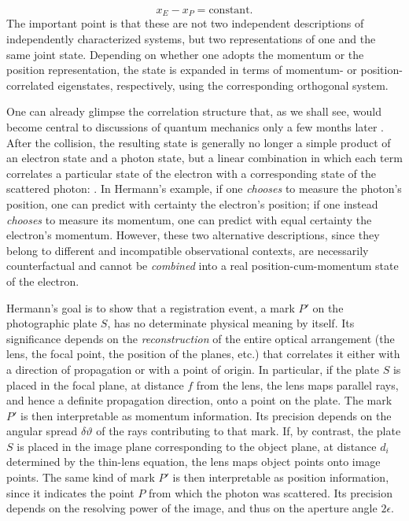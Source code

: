 \documentclass[pdflatex]{sn-jnl}
\newcommand{\NGQ}[2]{\citep[#1/#2]{Hermann1935}}
\begin{document}
\begin{equation*}
x_E-x_P=\text{constant}.
\end{equation*}
%
The important point is that these are not two independent descriptions of independently characterized systems, but two representations of one and the same joint state. Depending on whether one adopts the momentum or the position representation, the state is expanded in terms of momentum- or position-correlated eigenstates, respectively, using the corresponding orthogonal system.

One can already glimpse the correlation structure that, as we shall see, would become central to discussions of quantum mechanics only a few months later \citep[sec.~5.2]{Filk2016}. After the collision, the resulting state is generally no longer a simple product of an electron state and a photon state, but a linear combination in which each term correlates a particular state of the electron with a corresponding state of the scattered photon:  \NGQ{137}{270}. In Hermann’s example, if one \emph{chooses} to measure the photon’s position, one can predict with certainty the electron’s position; if one instead \emph{chooses} to measure its momentum, one can predict with equal certainty the electron’s momentum. However, these two alternative descriptions, since they belong to different and incompatible observational contexts, are necessarily counterfactual and cannot be \emph{combined} into a real position-cum-momentum state of the electron.

Hermann's goal is to show that a registration event, a mark $P'$ on the photographic plate $S$, has no determinate physical meaning by itself. Its significance depends on the \emph{reconstruction} of the entire optical arrangement (the lens, the focal point, the position of the planes, etc.) that correlates it either with a direction of propagation or with a point of origin. In particular, if the plate $S$ is placed in the focal plane, at distance $f$ from the lens, the lens maps parallel rays, and hence a definite propagation direction, onto a point on the plate. The mark $P'$ is then interpretable as momentum information. Its precision depends on the angular spread $\delta\vartheta$ of the rays contributing to that mark. If, by contrast, the plate $S$ is placed in the image plane corresponding to the object plane, at distance $d_i$ determined by the thin-lens equation, the lens maps object points onto image points. The same kind of mark $P'$ is then interpretable as position information, since it indicates the point $P$ from which the photon was scattered. Its precision depends on the resolving power of the image, and thus on the aperture angle $2\epsilon$.
\end{document}
